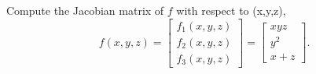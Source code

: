 Compute the Jacobian matrix of $f$ with respect to (x,y,z), 
    \[
        f(x,y,z) = 
        \begin{bmatrix}
            f_{1}(x,y,z) \\
            f_{2}(x,y,z) \\
            f_{3}(x,y,z)
        \end{bmatrix}
        =
        \begin{bmatrix}
            xyz \\
            y^2 \\
            x+z
        \end{bmatrix}.
    \]

\smallspace

